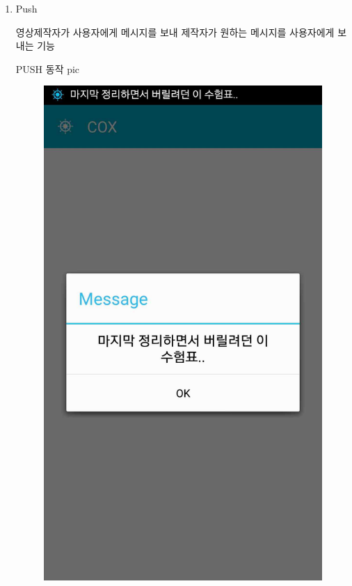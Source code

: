 \documentclass[chapter,oneside]{oblivoir}
\begin{document}
\begin{enumerate}

    \item  Push 

    영상제작자가 사용자에게 메시지를 보내 제작자가 원하는 메시지를 사용자에게 보내는 기능

    PUSH 동작 pic

    \begin{figure}[h!]
    \centering
    \includegraphics{pic/chp7/img1001}

\end{figure}
\end{enumerate}
\end{document}
